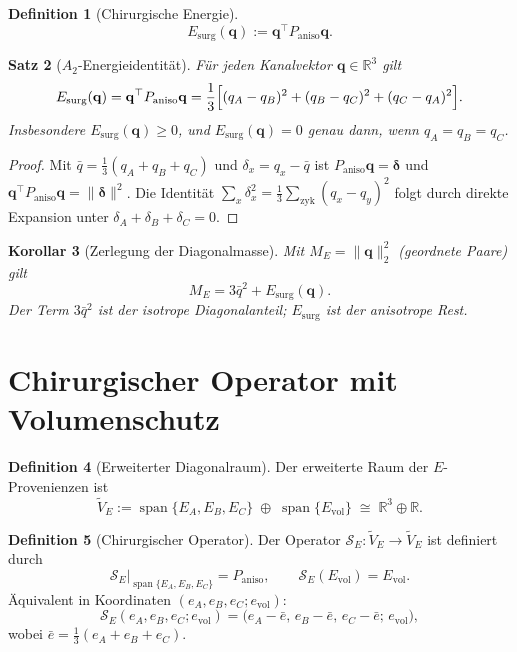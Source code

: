 \documentclass[11pt,a4paper]{article}
\newtheorem{theorem}{Satz}
\newtheorem{corollary}[theorem]{Korollar}
\theoremstyle{definition}
\newtheorem{definition}[theorem]{Definition}
\theoremstyle{remark}
\newcommand{\R}{\mathbb{R}}
\newcommand{\qq}{\mathbf{q}}
\newcommand{\Pan}{P_{\mathrm{aniso}}}
\newcommand{\Evol}{E_{\mathrm{vol}}}
\newcommand{\Esurg}{E_{\mathrm{surg}}}
\begin{document}
	\begin{definition}[Chirurgische Energie]
		\label{def:esurg}
		\[
		\Esurg(\qq)
		:=
		\qq^\top\Pan\qq.
		\]
	\end{definition}
	
	\begin{theorem}[$A_2$-Energieidentität]
		\label{thm:energy}
		Für jeden Kanalvektor $\qq\in\R^3$ gilt
		\[
		\Esurg(\qq)
		=
		\qq^\top\Pan\qq
		=
		\frac13\Bigl[
		(q_A-q_B)^2+(q_B-q_C)^2+(q_C-q_A)^2
		\Bigr].
		\]
		Insbesondere $\Esurg(\qq)\ge 0$, und
		$\Esurg(\qq)=0$ genau dann, wenn $q_A=q_B=q_C$.
	\end{theorem}
	
	\begin{proof}
		Mit $\bar q=\tfrac13(q_A+q_B+q_C)$ und $\delta_x=q_x-\bar q$ ist
		$\Pan\qq=\boldsymbol\delta$ und
		$\qq^\top\Pan\qq=\|\boldsymbol\delta\|^2$.
		Die Identität
		$\sum_x\delta_x^2=\tfrac13\sum_{\mathrm{zyk}}(q_x-q_y)^2$
		folgt durch direkte Expansion unter $\delta_A+\delta_B+\delta_C=0$.
	\end{proof}
	
	\begin{corollary}[Zerlegung der Diagonalmasse]
		\label{cor:decomp}
		Mit $M_E=\|\qq\|_2^2$ (geordnete Paare) gilt
		\[
		M_E
		=
		3\bar q^2+\Esurg(\qq).
		\]
		Der Term $3\bar q^2$ ist der \emph{isotrope Diagonalanteil};
		$\Esurg$ ist der anisotrope Rest.
	\end{corollary}
	
	\section{Chirurgischer Operator mit Volumenschutz}
	\label{sec:surgery}
	
	\begin{definition}[Erweiterter Diagonalraum]
		\label{def:extended}
		Der erweiterte Raum der $E$-Provenienzen ist
		\[
		\widetilde V_E
		:=
		\operatorname{span}\{E_A,E_B,E_C\}
		\;\oplus\;
		\operatorname{span}\{\Evol\}
		\;\cong\;
		\R^3\oplus\R.
		\]
	\end{definition}
	
	\begin{definition}[Chirurgischer Operator]
		\label{def:SE}
		Der Operator $\mathcal S_E:\widetilde V_E\to\widetilde V_E$ ist definiert durch
		\[
		\mathcal S_E\big|_{\operatorname{span}\{E_A,E_B,E_C\}}
		=
		\Pan,
		\qquad
		\mathcal S_E(\Evol)=\Evol.
		\]
		Äquivalent in Koordinaten $(e_A,e_B,e_C;e_{\mathrm{vol}})$:
		\[
		\mathcal S_E(e_A,e_B,e_C;e_{\mathrm{vol}})
		=
		\bigl(e_A-\bar e,\,e_B-\bar e,\,e_C-\bar e;\,e_{\mathrm{vol}}\bigr),
		\]
		wobei $\bar e=\tfrac13(e_A+e_B+e_C)$.
	\end{definition}
	
\end{document}
